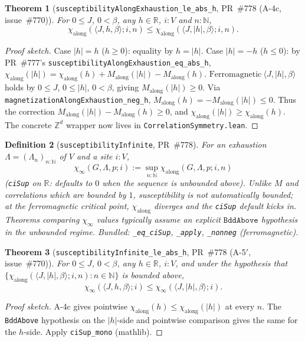 \documentclass[a4paper,11pt]{article}
\newtheorem{theorem}{Theorem}
\newtheorem{definition}[theorem]{Definition}
\begin{document}
\begin{theorem}[\texttt{susceptibilityAlongExhaustion\_le\_abs\_h},
PR~\#778 (A-4c, issue~\#770)]
For $0 \le J$, $0 < \beta$, any $h \in \mathbb R$, $i : V$ and $n : \mathbb N$,
\[
  \chi_{\mathrm{along}}(\langle J, h, \beta\rangle; i, n)
  \le \chi_{\mathrm{along}}(\langle J, |h|, \beta\rangle; i, n).
\]
\end{theorem}
\begin{proof}[Proof sketch]
Case $|h| = h$ ($h \ge 0$): equality by $h = |h|$. Case $|h| = -h$
($h \le 0$): by PR~\#777's \texttt{susceptibilityAlongExhaustion\_eq\_abs\_h},
$\chi_{\mathrm{along}}(|h|) = \chi_{\mathrm{along}}(h) + M_{\mathrm{along}}(|h|) - M_{\mathrm{along}}(h)$.
$\mathrm{Ferromagnetic}\ \langle J, |h|, \beta\rangle$ holds by
$0 \le J$, $0 \le |h|$, $0 < \beta$, giving
$M_{\mathrm{along}}(|h|) \ge 0$. Via
\texttt{magnetizationAlongExhaustion\_neg\_h}, $M_{\mathrm{along}}(h) = -M_{\mathrm{along}}(|h|) \le 0$.
Thus the correction $M_{\mathrm{along}}(|h|) - M_{\mathrm{along}}(h) \ge 0$, and
$\chi_{\mathrm{along}}(|h|) \ge \chi_{\mathrm{along}}(h)$.
The concrete $\mathbb Z^d$ wrapper now lives in
\texttt{CorrelationSymmetry.lean}.
\end{proof}

\begin{definition}[\texttt{susceptibilityInfinite}, PR~\#778]
For an exhaustion $\Lambda = (\Lambda_n)_{n : \mathbb N}$ of $V$ and a
site $i : V$,
\[
  \chi_\infty(G, \Lambda, p; i)
  := \sup_{n : \mathbb N} \chi_{\mathrm{along}}(G, \Lambda, p; i, n)
\]
(\texttt{ciSup} on $\mathbb R$: defaults to $0$ when the sequence is
unbounded above). Unlike $M$ and correlations which are bounded by $1$,
susceptibility is not automatically bounded; at the ferromagnetic
critical point, $\chi_{\mathrm{along}}$ diverges and the \texttt{ciSup}
default kicks in. Theorems comparing $\chi_\infty$ values typically
assume an explicit $\texttt{BddAbove}$ hypothesis in the unbounded
regime. Bundled: \texttt{\_eq\_ciSup}, \texttt{\_apply},
\texttt{\_nonneg} (ferromagnetic).
\end{definition}

\begin{theorem}[\texttt{susceptibilityInfinite\_le\_abs\_h},
PR~\#778 (A-5$'$, issue~\#770)]
For $0 \le J$, $0 < \beta$, any $h \in \mathbb R$, $i : V$, and under
the hypothesis that
$\{\chi_{\mathrm{along}}(\langle J, |h|, \beta\rangle; i, n) : n \in \mathbb N\}$
is bounded above,
\[
  \chi_\infty(\langle J, h, \beta\rangle; i)
  \le \chi_\infty(\langle J, |h|, \beta\rangle; i).
\]
\end{theorem}
\begin{proof}[Proof sketch]
A-4c gives pointwise $\chi_{\mathrm{along}}(h) \le \chi_{\mathrm{along}}(|h|)$
at every $n$. The \texttt{BddAbove} hypothesis on the $|h|$-side and
pointwise comparison gives the same for the $h$-side. Apply
\texttt{ciSup\_mono} (mathlib).
\end{proof}
\end{document}
